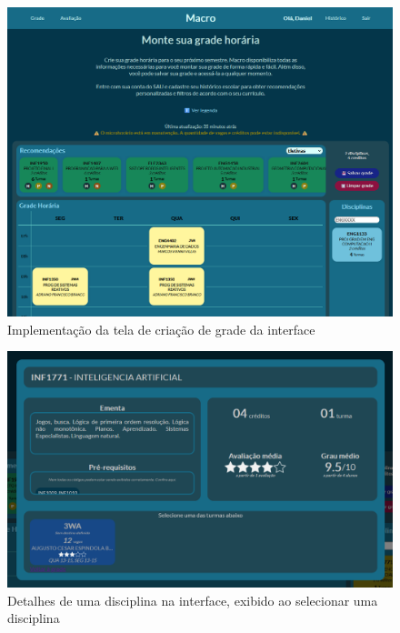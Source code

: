 \begin{figure}[ht]
    \begin{center}
    \includegraphics[width=360pt]{figuras/tela-grade.png}
    \caption{Implementação da tela de criação de grade da interface}
    \label{fig:tela-grade-impl}
    \end{center}
\end{figure}

\begin{figure}[ht]
    \begin{center}
    \includegraphics[width=360pt]{figuras/detalhe-turma.png}
    \caption{Detalhes de uma disciplina na interface, exibido ao selecionar uma disciplina}
    \label{fig:detalhe-turmas-impl}
    \end{center}
\end{figure}

